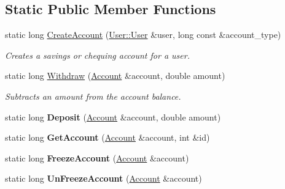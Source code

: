\subsection*{Static Public Member Functions}
\begin{DoxyCompactItemize}
\item 
static long \hyperlink{classAccountTable_a21d33d81d195d65345eb0e62bfefcc25}{Create\-Account} (\hyperlink{classUser_1_1User}{User\-::\-User} \&user, long const \&account\-\_\-type)
\begin{DoxyCompactList}\small\item\em Creates a savings or chequing account for a user. \end{DoxyCompactList}\item 
static long \hyperlink{classAccountTable_a55eedcfb00f5eb7791248c540093c11c}{Withdraw} (\hyperlink{classAccount}{Account} \&account, double amount)
\begin{DoxyCompactList}\small\item\em Subtracts an amount from the account balance. \end{DoxyCompactList}\item 
\hypertarget{classAccountTable_a263c5492a4363f8b6759aa352c6f1b98}{static long {\bfseries Deposit} (\hyperlink{classAccount}{Account} \&account, double amount)}\label{classAccountTable_a263c5492a4363f8b6759aa352c6f1b98}

\item 
\hypertarget{classAccountTable_af21d68cc9288a375318ce48014dd3a97}{static long {\bfseries Get\-Account} (\hyperlink{classAccount}{Account} \&account, int \&id)}\label{classAccountTable_af21d68cc9288a375318ce48014dd3a97}

\item 
\hypertarget{classAccountTable_a607b08a95021ccf8f42871fe3f41fdef}{static long {\bfseries Freeze\-Account} (\hyperlink{classAccount}{Account} \&account)}\label{classAccountTable_a607b08a95021ccf8f42871fe3f41fdef}

\item 
\hypertarget{classAccountTable_a203e383ed970bc5275a3ed4ec8b0df9a}{static long {\bfseries Un\-Freeze\-Account} (\hyperlink{classAccount}{Account} \&account)}\label{classAccountTable_a203e383ed970bc5275a3ed4ec8b0df9a}


\end{DoxyCompactItemize}
